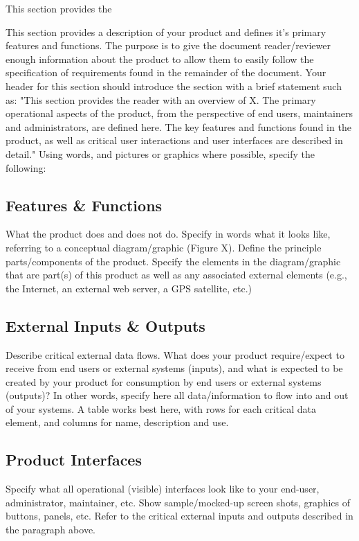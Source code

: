 This section provides the 






This section provides a description of your product and defines it's primary features and functions. The purpose is to give the document reader/reviewer enough information about the product to allow them to easily follow the specification of requirements found in the remainder of the document. Your header for this section should introduce the section with a brief statement such as: "This section provides the reader with an overview of X. The primary operational aspects of the product, from the perspective of end users, maintainers and administrators, are defined here. The key features and functions found in the product, as well as critical user interactions and user interfaces are described in detail." Using words, and pictures or graphics where possible, specify the following:

\subsection{Features \& Functions}
What the product does and does not do. Specify in words what it looks like, referring to a conceptual diagram/graphic (Figure X).  Define the principle parts/components of the product. Specify the elements in the diagram/graphic that are part(s) of this product as well as any associated external elements (e.g., the Internet, an external web server, a GPS satellite, etc.)

\subsection{External Inputs \& Outputs}
Describe critical external data flows. What does your product require/expect to receive from end users or external systems (inputs), and what is expected to be created by your product for consumption by end users or external systems (outputs)? In other words, specify here all data/information to flow into and out of your systems. A table works best here, with rows for each critical data element, and columns for name, description and use.

\subsection{Product Interfaces}
Specify what all operational (visible) interfaces look like to your end-user, administrator, maintainer, etc. Show sample/mocked-up screen shots, graphics of buttons, panels, etc. Refer to the critical external inputs and outputs described in the paragraph above.
